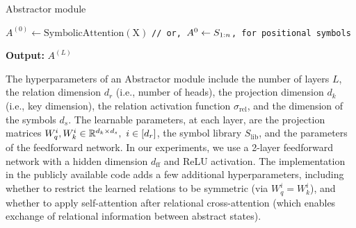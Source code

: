 \begin{algorithm}[ht!]
	\caption{Abstractor module}\label{alg:abstractor_module}

	\vspace{1em}

    $A^{(0)} \gets \mathrm{SymbolicAttention(X)}$ \quad \texttt{// or, $A^{0} \gets S_{1:n}$, for positional symbols}


    \textbf{Output:} $A^{(L)}$

\end{algorithm}

The hyperparameters of an Abstractor module include the number of layers $L$, the relation dimension $d_r$ (i.e., number of heads),  the projection dimension $d_k$ (i.e., key dimension), the relation activation function $\sigma_{\mathrm{rel}}$, and the dimension of the symbols $d_s$. The learnable parameters, at each layer, are the projection matrices $W_q^{i}, W_k^{i} \in \mathbb{R}^{d_k \times d_s}, \ i \in [d_r]$, the symbol library $S_{\mathrm{lib}}$, and the parameters of the feedforward network. In our experiments, we use a 2-layer feedforward network with a hidden dimension $d_{\mathrm{ff}}$ and ReLU activation. The implementation in the publicly available code adds a few additional hyperparameters, including whether to restrict the learned relations to be symmetric (via $W_q^{i} = W_k^{i}$), and whether to apply self-attention after relational cross-attention (which enables exchange of relational information between abstract states).

